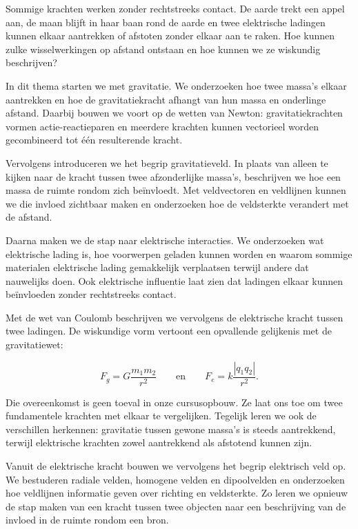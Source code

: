 \documentclass{xourse}
\begin{document}
\begin{themaintro}{}

  Sommige krachten werken zonder rechtstreeks contact. De aarde trekt
  een appel aan, de maan blijft in haar baan rond de aarde en twee
  elektrische ladingen kunnen elkaar aantrekken of afstoten zonder elkaar
  aan te raken. Hoe kunnen zulke wisselwerkingen op afstand ontstaan en
  hoe kunnen we ze wiskundig beschrijven?

  In dit thema starten we met gravitatie. We onderzoeken hoe twee massa's
  elkaar aantrekken en hoe de gravitatiekracht afhangt van hun massa en
  onderlinge afstand. Daarbij bouwen we voort op de wetten van Newton:
  gravitatiekrachten vormen actie-reactieparen en meerdere krachten kunnen
  vectorieel worden gecombineerd tot één resulterende kracht.

  Vervolgens introduceren we het begrip gravitatieveld. In plaats van
  alleen te kijken naar de kracht tussen twee afzonderlijke massa's,
  beschrijven we hoe een massa de ruimte rondom zich beïnvloedt. Met
  veldvectoren en veldlijnen kunnen we die invloed zichtbaar maken en
  onderzoeken hoe de veldsterkte verandert met de afstand.

  Daarna maken we de stap naar elektrische interacties. We onderzoeken wat
  elektrische lading is, hoe voorwerpen geladen kunnen worden en waarom
  sommige materialen elektrische lading gemakkelijk verplaatsen terwijl
  andere dat nauwelijks doen. Ook elektrische influentie laat zien dat
  ladingen elkaar kunnen beïnvloeden zonder rechtstreeks contact.

  Met de wet van Coulomb beschrijven we vervolgens de elektrische kracht
  tussen twee ladingen. De wiskundige vorm vertoont een opvallende
  gelijkenis met de gravitatiewet:

  \[
  F_g
  =
  G\frac{m_1m_2}{r^2}
  \qquad\text{en}\qquad
  F_e
  =
  k\frac{|q_1q_2|}{r^2}.
  \]

  Die overeenkomst is geen toeval in onze cursusopbouw. Ze laat ons toe
  om twee fundamentele krachten met elkaar te vergelijken. Tegelijk leren
  we ook de verschillen herkennen: gravitatie tussen gewone massa's is
  steeds aantrekkend, terwijl elektrische krachten zowel aantrekkend als
  afstotend kunnen zijn.

  Vanuit de elektrische kracht bouwen we vervolgens het begrip elektrisch
  veld op. We bestuderen radiale velden, homogene velden en dipoolvelden
  en onderzoeken hoe veldlijnen informatie geven over richting en
  veldsterkte. Zo leren we opnieuw de stap maken van een kracht tussen twee
  objecten naar een beschrijving van de invloed in de ruimte rondom een
  bron.


\end{themaintro}
\end{document}
